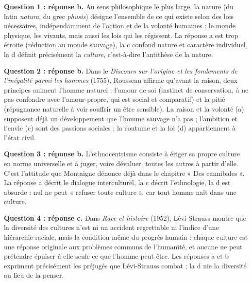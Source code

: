 \documentclass[11pt]{article}
\newcommand{\cle}[1]{{\popxbold\color{popdark}#1}}
\begin{document}
\begin{corrige}
\textbf{Question 1 : réponse b.} Au sens philosophique le plus large, la \cle{nature} (du latin \emph{natura}, du grec \emph{phusis}) désigne l'ensemble de ce qui existe selon des lois nécessaires, indépendamment de l'action et de la volonté humaines : le monde physique, les vivants, mais aussi les lois qui les régissent. La réponse a est trop étroite (réduction au monde sauvage), la c confond nature et caractère individuel, la d définit précisément la \emph{culture}, c'est-à-dire l'antithèse de la nature.

\textbf{Question 2 : réponse b.} Dans le \emph{Discours sur l'origine et les fondements de l'inégalité parmi les hommes} (1755), Rousseau affirme qu'avant la raison, deux principes animent l'homme naturel : l'\cle{amour de soi} (instinct de conservation, à ne pas confondre avec l'amour-propre, qui est social et comparatif) et la \cle{pitié} (répugnance naturelle à voir souffrir un être sensible). La raison et la volonté (a) supposent déjà un développement que l'homme sauvage n'a pas ; l'ambition et l'envie (c) sont des passions sociales ; la coutume et la loi (d) appartiennent à l'état civil.

\textbf{Question 3 : réponse b.} L'\cle{ethnocentrisme} consiste à ériger sa propre culture en norme universelle et à juger, voire dévaluer, toutes les autres à partir d'elle. C'est l'attitude que Montaigne dénonce déjà dans le chapitre « Des cannibales ». La réponse a décrit le dialogue interculturel, la c décrit l'ethnologie, la d est absurde : nul ne peut « refuser toute culture », car tout homme naît dans une culture.

\textbf{Question 4 : réponse c.} Dans \emph{Race et histoire} (1952), Lévi-Strauss montre que la diversité des cultures n'est ni un accident regrettable ni l'indice d'une hiérarchie raciale, mais la condition même du progrès humain : chaque culture est une réponse originale aux problèmes communs de l'humanité, et aucune ne peut prétendre épuiser à elle seule ce que l'homme peut être. Les réponses a et b expriment précisément les préjugés que Lévi-Strauss combat ; la d nie la diversité au lieu de la penser.
\end{corrige}
\end{document}
